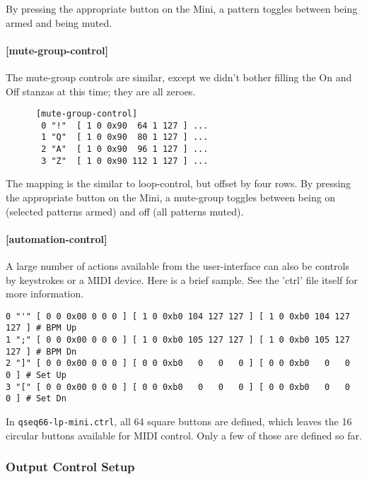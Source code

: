    By pressing the appropriate button on the Mini, a pattern toggles between being
   armed and being muted.

\paragraph{[mute-group-control]}
\label{paragraph:patterns_mute_group_control}

   The mute-group controls are similar, except we didn't bother filling the On
   and Off stanzas at this time; they are all zeroes.

   \begin{verbatim}
      [mute-group-control]
       0 "!"  [ 1 0 0x90  64 1 127 ] ...
       1 "Q"  [ 1 0 0x90  80 1 127 ] ...
       2 "A"  [ 1 0 0x90  96 1 127 ] ...
       3 "Z"  [ 1 0 0x90 112 1 127 ] ...
   \end{verbatim}

   The mapping is the similar to loop-control, but offset by four rows.
   By pressing the appropriate button on the Mini, a mute-group toggles between
   being on (selected patterns armed) and off (all patterns muted).

\paragraph{[automation-control]}
\label{paragraph:patterns_automation_control}

   A large number of actions available from the user-interface can also be
   controls by keystrokes or a MIDI device.  Here is a brief sample.  See the
   'ctrl' file itself for more information.

\begin{verbatim}
0 "'" [ 0 0 0x00 0 0 0 ] [ 1 0 0xb0 104 127 127 ] [ 1 0 0xb0 104 127 127 ] # BPM Up
1 ";" [ 0 0 0x00 0 0 0 ] [ 1 0 0xb0 105 127 127 ] [ 1 0 0xb0 105 127 127 ] # BPM Dn
2 "]" [ 0 0 0x00 0 0 0 ] [ 0 0 0xb0   0   0   0 ] [ 0 0 0xb0   0   0   0 ] # Set Up
3 "[" [ 0 0 0x00 0 0 0 ] [ 0 0 0xb0   0   0   0 ] [ 0 0 0xb0   0   0   0 ] # Set Dn
\end{verbatim}

   In \texttt{qseq66-lp-mini.ctrl}, all 64 square buttons are defined, which
   leaves the 16 circular buttons available for MIDI control. Only a few of those
   are defined so far.

\subsubsection{Output Control Setup}
\label{subsubsec:launchpad_mini_output_control_setup}

